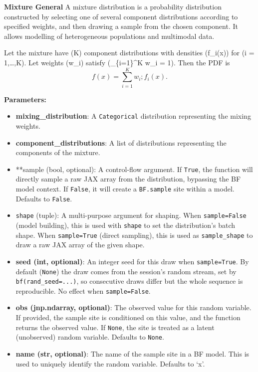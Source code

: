 \documentclass[
  letterpaper,
  DIV=11,
  numbers=noendperiod]{scrartcl}
\begin{document}
\textbf{Mixture General} A mixture distribution is a probability
distribution constructed by selecting one of several component
distributions according to specified weights, and then drawing a sample
from the chosen component. It allows modelling of heterogeneous
populations and multimodal data.

Let the mixture have (K) component distributions with densities
(f\_i(x)) for (i = 1,\dots,K). Let weights (w\_i) satisfy
(\sum\_\{i=1\}\^{}K w\_i = 1). Then the PDF is \[
f(x) = \sum_{i=1}^K w_i ; f_i(x).
\]

\textbf{Parameters:}

\begin{itemize}
\item
  \textbf{mixing\_distribution}: A \texttt{Categorical} distribution
  representing the mixing weights.
\item
  \textbf{component\_distributions}: A list of distributions
  representing the components of the mixture.
\item
  **sample (bool, optional): A control-flow argument. If \texttt{True},
  the function will directly sample a raw JAX array from the
  distribution, bypassing the BF model context. If \texttt{False}, it
  will create a \texttt{BF.sample} site within a model. Defaults to
  \texttt{False}.
\item
  \texttt{shape} (tuple): A multi-purpose argument for shaping. When
  \texttt{sample=False} (model building), this is used with
  \texttt{shape} to set the distribution's batch shape. When
  \texttt{sample=True} (direct sampling), this is used as
  \texttt{sample\_shape} to draw a raw JAX array of the given shape.
\item
  \textbf{seed (int, optional)}: An integer seed for this draw when
  \texttt{sample=True}. By default (\texttt{None}) the draw comes from
  the session's random stream, set by \texttt{bf(rand\_seed=...)}, so
  consecutive draws differ but the whole sequence is reproducible. No
  effect when \texttt{sample=False}.
\item
  \textbf{obs (jnp.ndarray, optional)}: The observed value for this
  random variable. If provided, the sample site is conditioned on this
  value, and the function returns the observed value. If \texttt{None},
  the site is treated as a latent (unobserved) random variable. Defaults
  to \texttt{None}.
\item
  \textbf{name (str, optional)}: The name of the sample site in a BF
  model. This is used to uniquely identify the random variable. Defaults
  to `x'.
\end{itemize}
\end{document}
